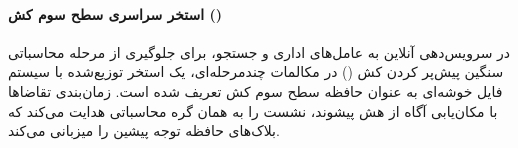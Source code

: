 \paragraph*{استخر سراسری سطح سوم کش ()}
در سرویس‌دهی آنلاین به عامل‌های اداری و جستجو، برای جلوگیری از مرحله محاسباتی سنگین پیش‌پر کردن کش () در مکالمات چندمرحله‌ای، یک استخر توزیع‌شده با سیستم فایل خوشه‌ای به عنوان حافظه سطح سوم کش تعریف شده است. زمان‌بندی تقاضاها با مکان‌یابی آگاه از هش پیشوند، نشست را به همان گره محاسباتی هدایت می‌کند که بلاک‌های حافظه توجه پیشین را میزبانی می‌کند.